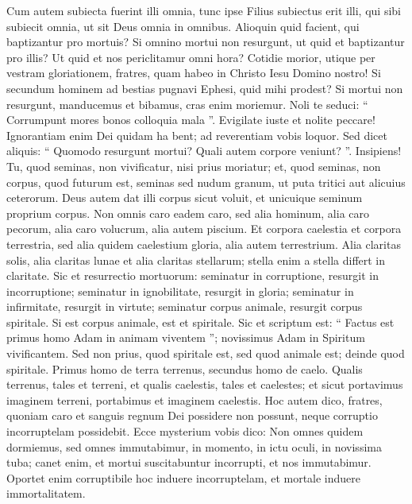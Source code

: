 \begin{biblechapter}
\begin{biblechapter}
\begin{biblechapter}
\begin{biblechapter}
\begin{biblechapter}
\begin{biblechapter}
\begin{biblechapter}
\begin{biblechapter}
\begin{biblechapter}
\begin{biblechapter}
\begin{biblechapter}
\begin{biblechapter}
\begin{biblechapter}
\begin{biblechapter}
\begin{biblechapter}
\verse Cum autem subiecta fuerint illi omnia, tunc ipse Filius subiectus erit illi, qui sibi subiecit omnia, ut sit Deus omnia in omnibus.
 \verse Alioquin quid facient, qui baptizantur pro mortuis? Si omnino mortui non resurgunt, ut quid et baptizantur pro illis? 
\verse Ut quid et nos periclitamur omni hora? 
\verse Cotidie morior, utique per vestram gloriationem, fratres, quam habeo in Christo Iesu Domino nostro! 
\verse Si secundum hominem ad bestias pugnavi Ephesi, quid mihi prodest? Si mortui non resurgunt, manducemus et bibamus, cras enim moriemur. 
\verse Noli te seduci: “ Corrumpunt mores bonos colloquia mala ”. 
\verse Evigilate iuste et nolite peccare! Ignorantiam enim Dei quidam ha bent; ad reverentiam vobis loquor. 
\verse Sed dicet aliquis: “ Quomodo resurgunt mortui? Quali autem corpore veniunt? ”. 
\verse Insipiens! Tu, quod seminas, non vivificatur, nisi prius moriatur; 
\verse et, quod seminas, non corpus, quod futurum est, seminas sed nudum granum, ut puta tritici aut alicuius ceterorum. 
\verse Deus autem dat illi corpus sicut voluit, et unicuique seminum proprium corpus. 
\verse Non omnis caro eadem caro, sed alia hominum, alia caro pecorum, alia caro volucrum, alia autem piscium. 
\verse Et corpora caelestia et corpora terrestria, sed alia quidem caelestium gloria, alia autem terrestrium. 
 \verse Alia claritas solis, alia claritas lunae et alia claritas stellarum; stella enim a stella differt in claritate. 
\verse Sic et resurrectio mortuorum: seminatur in corruptione, resurgit in incorruptione; 
\verse seminatur in ignobilitate, resurgit in gloria; seminatur in infirmitate, resurgit in virtute; 
 \verse seminatur corpus animale, resurgit corpus spiritale.
 Si est corpus animale, est et spiritale. 
\verse Sic et scriptum est: “ Factus est primus homo Adam in animam viventem ”; novissimus Adam in Spiritum vivificantem. 
\verse Sed non prius, quod spiritale est, sed quod animale est; deinde quod spiritale. 
\verse Primus homo de terra terrenus, secundus homo de caelo. 
\verse Qualis terrenus, tales et terreni, et qualis caelestis, tales et caelestes; 
\verse et sicut portavimus imaginem terreni, portabimus et imaginem caelestis. 
\verse Hoc autem dico, fratres, quoniam caro et sanguis regnum Dei possidere non possunt, neque corruptio incorruptelam possidebit. 
\verse Ecce mysterium vobis dico: Non omnes quidem dormiemus, sed omnes immutabimur, 
\verse in momento, in ictu oculi, in novissima tuba; canet enim, et mortui suscitabuntur incorrupti, et nos immutabimur. 
\verse Oportet enim corruptibile hoc induere incorruptelam, et mortale induere immortalitatem. 

\end{biblechapter}
\end{biblechapter}
\end{biblechapter}
\end{biblechapter}
\end{biblechapter}
\end{biblechapter}
\end{biblechapter}
\end{biblechapter}
\end{biblechapter}
\end{biblechapter}
\end{biblechapter}
\end{biblechapter}
\end{biblechapter}
\end{biblechapter}
\end{biblechapter}
